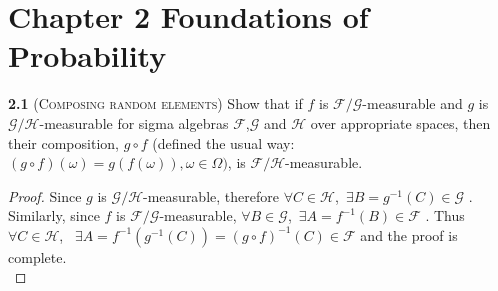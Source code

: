 

\chapter*{Chapter 2 Foundations of Probability}
\label{sec:second}



\noindent\textbf{2.1} (\textsc{Composing random elements}) Show that if $f$ is $\mathcal{F}/\mathcal{G}$-measurable and $g$ 
is $\mathcal{G}/\mathcal{H}$-measurable for sigma algebras $\mathcal{F}$,$\mathcal{G}$ and $\mathcal{H}$ over appropriate spaces, then
their composition, $g \circ f$ (defined the usual way: $( g \circ f )(\omega) = g(f(\omega)), \omega \in \Omega)$, is
$\mathcal{F}/\mathcal{H}$-measurable.

\begin{proof}
    Since $g$ is $\mathcal{G}/\mathcal{H}$-measurable, therefore $\forall C \in \mathcal{H}$,\ $ \exists  B=g^{-1}(C)\in \mathcal{G} $ . Similarly, since $f$ is $\mathcal{F}/\mathcal{G}$-measurable, $\forall B \in \mathcal{G}$,\ $ \exists  A=f^{-1}(B)\in \mathcal{F} $ . Thus $\forall C \in \mathcal{H}$, \ $ \exists  A=f^{-1}(g^{-1}(C))=(g\circ f)^{-1}(C)\in \mathcal{F} $ and the proof is complete. \\

\end{proof}

